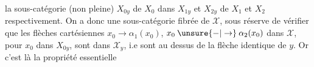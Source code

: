   la sous-catégorie (non pleine) $X_{0y}$ de $X_0$ dans  $X_{1y}$ et  $X_{2y}$ de $X_1$ et $X_2$ respectivement. On a donc une sous-catégorie fibrée de $\mathscr X$, sous réserve de vérifier que les flèches  cartésiennes $x_0\longrightarrow\alpha_1(x_0)$, $x_0\mathbin{\unsure{-|\to}}\alpha_2(x_0)$ dans $\mathscr X$,  pour $x_0$ dans $X_{0y}$, sont dans $\mathscr X_y$, i.e sont au dessus de la flèche identique de $y$. Or c'est là la propriété essentielle
